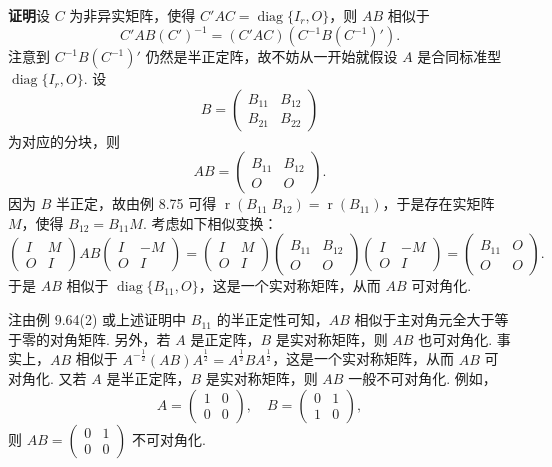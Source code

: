 \documentclass[UTF8,12pt,a4paper,fontset=fandol]{ctexart}
\begin{document}
\noindent\textbf{证明}\quad 设 $C$ 为非异实矩阵，使得 $C'AC=\operatorname{diag}\{I_r,O\}$，则 $AB$ 相似于
\[
C'AB(C')^{-1}=(C'AC)(C^{-1}B(C^{-1})').
\]
注意到 $C^{-1}B(C^{-1})'$ 仍然是半正定阵，故不妨从一开始就假设 $A$ 是合同标准型 $\operatorname{diag}\{I_r,O\}$. 设
\[
B=\begin{pmatrix}
B_{11}&B_{12}\\
B_{21}&B_{22}
\end{pmatrix}
\]
为对应的分块，则
\[
AB=\begin{pmatrix}
B_{11}&B_{12}\\
O&O
\end{pmatrix}.
\]
因为 $B$ 半正定，故由例 8.75 可得 $\operatorname{r}(B_{11}\;B_{12})=\operatorname{r}(B_{11})$，于是存在实矩阵 $M$，使得 $B_{12}=B_{11}M$. 考虑如下相似变换：
\[
\begin{pmatrix}
I&M\\
O&I
\end{pmatrix}
AB
\begin{pmatrix}
I&-M\\
O&I
\end{pmatrix}
=
\begin{pmatrix}
I&M\\
O&I
\end{pmatrix}
\begin{pmatrix}
B_{11}&B_{12}\\
O&O
\end{pmatrix}
\begin{pmatrix}
I&-M\\
O&I
\end{pmatrix}
=
\begin{pmatrix}
B_{11}&O\\
O&O
\end{pmatrix}.
\]
于是 $AB$ 相似于 $\operatorname{diag}\{B_{11},O\}$，这是一个实对称矩阵，从而 $AB$ 可对角化.

注\quad 由例 9.64(2) 或上述证明中 $B_{11}$ 的半正定性可知，$AB$ 相似于主对角元全大于等于零的对角矩阵. 另外，若 $A$ 是正定阵，$B$ 是实对称矩阵，则 $AB$ 也可对角化. 事实上，$AB$ 相似于 $A^{-\frac12}(AB)A^{\frac12}=A^{\frac12}BA^{\frac12}$，这是一个实对称矩阵，从而 $AB$ 可对角化. 又若 $A$ 是半正定阵，$B$ 是实对称矩阵，则 $AB$ 一般不可对角化. 例如，
\[
A=\begin{pmatrix}1&0\\0&0\end{pmatrix},\quad
B=\begin{pmatrix}0&1\\1&0\end{pmatrix},
\]
则 $AB=\begin{pmatrix}0&1\\0&0\end{pmatrix}$ 不可对角化.
\end{document}
